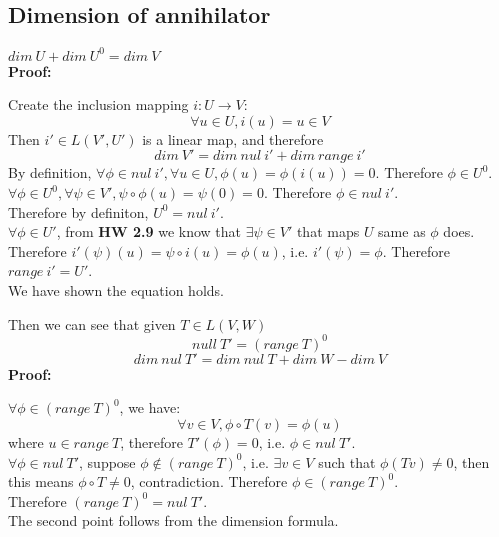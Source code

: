 \documentclass{article}
\begin{document}
\subsection{Dimension of annihilator}
$dim\ U + dim\ U^0 = dim\ V$\\
\textbf{Proof:}
\begin{addmargin}[1em]{0em}
Create the inclusion mapping $i:U \rightarrow V$:
\begin{equation*}
    \forall u \in U, i(u) = u \in V
\end{equation*}
Then $i' \in L(V', U')$ is a linear map, and therefore
\begin{equation*}
    dim\ V' = dim\ nul\ i' + dim\ range\ i'
\end{equation*}
By definition, $\forall \phi \in nul\ i', \forall u \in U, \phi(u) = \phi(i(u)) = 0$. Therefore $\phi \in U^0$.\\
$\forall \phi \in U^0, \forall \psi \in V', \psi \circ \phi(u) = \psi(0) = 0$. Therefore $\phi \in nul\ i'$.\\
Therefore by definiton, $U^0 = nul\ i'$.\\
$\forall \phi \in U'$, from \textbf{HW 2.9} we know that $\exists \psi \in V'$ that maps $U$ same as $\phi$ does. Therefore $i'(\psi)(u) = \psi \circ i(u) = \phi(u)$, i.e. $i'(\psi) = \phi$. Therefore $range\ i' = U'$.\\
We have shown the equation holds.
\end{addmargin}
Then we can see that given $T \in L(V, W)$
\begin{equation*}
    null\ T' = (range\ T)^0
\end{equation*}
\begin{equation*}
    dim\ nul\ T' = dim\ nul\ T + dim\ W - dim\ V
\end{equation*}
\textbf{Proof:}
\begin{addmargin}[1em]{0em}
$\forall \phi \in (range\ T)^0$, we have:
\begin{equation*}
    \forall v \in V, \phi \circ T(v) = \phi(u)
\end{equation*}
where $u \in range\ T$, therefore $T'(\phi) = 0$, i.e. $\phi \in nul\ T'$.\\
$\forall \phi \in nul\ T'$, suppose $\phi \notin (range\ T)^0$, i.e. $\exists v \in V$ such that $\phi(Tv) \neq 0$, then this means $\phi \circ T \neq 0$, contradiction. Therefore $\phi \in (range\ T)^0$.\\
Therefore $(range\ T)^0 = nul\ T'$.\\
The second point follows from the dimension formula.
\end{addmargin}
\end{document}
